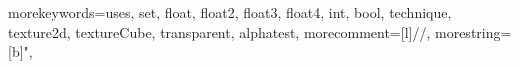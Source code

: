 \newcommand{\sketchtext}[1]{{\sffamily{#1}}}

\newcommand{\code}[1]{{\ttfamily{\mbox{#1}}}}

\newcommand{\myurl}[1]{{\footnotesize\url{#1}}}

\lstset{=\ttfamily\color{DarkGreen}}
\lstset{basicstyle=\ttfamily\small}
\lstset{breaklines=true}
\lstset{captionpos=b}
\lstset{xleftmargin=15pt}
\renewcommand{\lstlistlistingname}{List of Listings}

\newcommand{\pentag}{Penta~G}
\newcommand{\gxengine}{GebauzEngine}

{
morekeywords={uses, set, float, float2, float3, float4, int, bool, technique, texture2d, textureCube, transparent, alphatest},
morecomment=[l]{//},
morestring=[b]",
}



    \renewcommand{\topfraction}{0.9}	%
    \renewcommand{\bottomfraction}{0.8}	%
    \setcounter{topnumber}{2}
    \setcounter{bottomnumber}{2}
    \setcounter{totalnumber}{4}     %
    \setcounter{dbltopnumber}{2}    %
    \renewcommand{\dbltopfraction}{0.9}	%
    \renewcommand{\textfraction}{0.07}	%
    \renewcommand{\floatpagefraction}{0.7}	%
    \renewcommand{\dblfloatpagefraction}{0.7}	%


